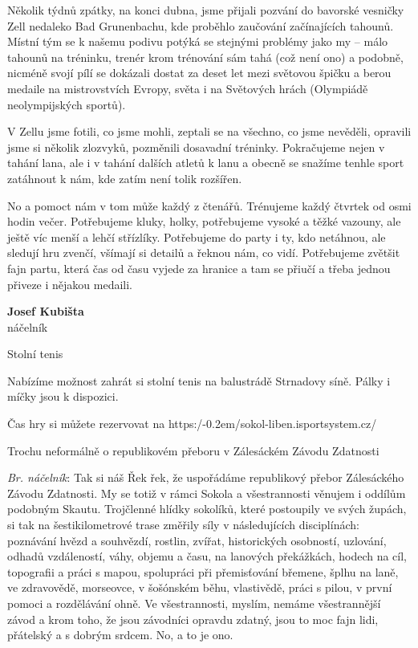 \documentclass[11pt]{article}
\newcommand{\post}[1]{%
\begin{center}
{\huge \tyrs #1}
\end{center}
}
\newcommand{\signature}[2]{%
  \begin{flushright}
    \textbf{#1}\\#2
  \end{flushright}
}
\begin{document}
Několik týdnů zpátky, na konci dubna, jsme přijali pozvání do bavorské vesničky Zell nedaleko Bad Grunenbachu, kde proběhlo zaučování začínajících tahounů. Místní tým se k našemu podivu potýká se stejnými problémy jako my – málo tahounů na tréninku, trenér krom trénování sám tahá (což není ono) a podobně, nicméně svojí pílí se dokázali dostat za deset let mezi světovou špičku a berou medaile na mistrovstvích Evropy, světa i na Světových hrách (Olympiádě neolympijských sportů).

V Zellu jsme fotili, co jsme mohli, zeptali se na všechno, co jsme nevěděli, opravili jsme si několik zlozvyků, pozměnili dosavadní tréninky. Pokračujeme nejen v tahání lana, ale i v tahání dalších atletů k lanu a obecně se snažíme tenhle sport zatáhnout k nám, kde zatím není tolik rozšířen.

No a pomoct nám v tom může každý z čtenářů. Trénujeme každý čtvrtek od osmi hodin večer. Potřebujeme kluky, holky, potřebujeme vysoké a těžké vazouny, ale ještě víc menší a lehčí střízlíky. Potřebujeme do party i ty, kdo netáhnou, ale sledují hru zvenčí, všímají si detailů a řeknou nám, co vidí. Potřebujeme zvětšit fajn partu, která čas od času vyjede za hranice a tam se přiučí a třeba jednou přiveze i nějakou medaili.

\signature{Josef Kubišta}{náčelník}

\vspace{12pt}

\post{Stolní tenis}
Nabízíme možnost zahrát si stolní tenis na balustrádě Strnadovy síně. Pálky i míčky jsou k dispozici.

Čas hry si můžete rezervovat na https:/\kern-0.2em/sokol-liben.isportsystem.cz/

\clearpage

\post{Trochu neformálně \linebreak o republikovém přeboru \linebreak v Zálesáckém Závodu Zdatnosti}
\textit{Br. náčelník}: Tak si náš Řek řek, že uspořádáme republikový přebor Zálesáckého Závodu Zdatnosti. My se totiž v rámci Sokola a všestrannosti věnujem i oddílům podobným Skautu.
Trojčlenné hlídky sokolíků, které postoupily ve svých župách, si tak na šestikilometrové trase změřily síly v následujících disciplínách: poznávání hvězd a souhvězdí, rostlin, zvířat, historických osobností, uzlování, odhadů vzdáleností, váhy, objemu a času, na lanových překážkách, hodech na cíl, topografii a práci s mapou, spolupráci při přemisťování břemene, šplhu na laně, ve zdravovědě, morseovce, v šošónském běhu, vlastivědě, práci s pilou, v první pomoci a rozdělávání ohně.
Ve všestrannosti, myslím, nemáme všestrannější závod a krom toho, že jsou závodníci opravdu zdatný, jsou to moc fajn lidi, přátelský a s dobrým srdcem. No, a to je ono.
\end{document}
